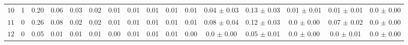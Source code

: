 \begin{tabular}{l|cc|cccccccc|ccccc}
 $10$  & 1 & 0.20 & 0.06 & 0.03 & 0.02 & 0.01 & 0.01 & 0.01 & 0.01 & 0.01 & 0.04 $\pm$ 0.03 & 0.13 $\pm$ 0.03 & 0.01 $\pm$ 0.01 & 0.01 $\pm$ 0.01 & 0.0 $\pm$ 0.00 \\ 
 $11$  & 0 & 0.26 & 0.08 & 0.02 & 0.02 & 0.01 & 0.01 & 0.01 & 0.01 & 0.01 & 0.08 $\pm$ 0.04 & 0.12 $\pm$ 0.03 & 0.0 $\pm$ 0.00 & 0.07 $\pm$ 0.02 & 0.0 $\pm$ 0.00 \\ 
 $12$  & 0 & 0.05 & 0.01 & 0.01 & 0.01 & 0.00 & 0.01 & 0.01 & 0.01 & 0.00 & 0.0 $\pm$ 0.00 & 0.05 $\pm$ 0.01 & 0.0 $\pm$ 0.00 & 0.0 $\pm$ 0.01 & 0.0 $\pm$ 0.00 \\ 
\end{tabular} 
